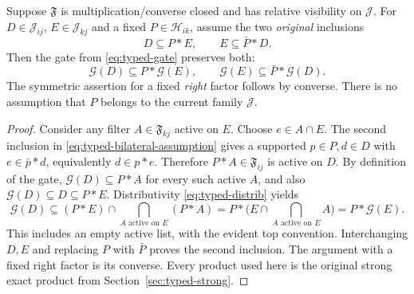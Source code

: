 \begin{lemma}
\label{lem:typed-bilateral}
Suppose $\mathfrak F$ is multiplication/converse closed and has
relative visibility on $\mathcal J$.  For
$D\in\mathcal J_{ij}$, $E\in\mathcal J_{kj}$ and a fixed
$P\in\mathcal H_{ik}$, assume the two \emph{original} inclusions
\begin{equation}\label{eq:typed-bilateral-assumption}
 D\subseteq P*E,\qquad E\subseteq\bar P*D.
\end{equation}
Then the gate from \eqref{eq:typed-gate} preserves both:
\begin{equation}\label{eq:typed-bilateral-conclusion}
 \mathcal G(D)\subseteq P*\mathcal G(E),\qquad
 \mathcal G(E)\subseteq\bar P*\mathcal G(D).
\end{equation}
The symmetric assertion for a fixed \emph{right} factor follows by
converse.  There is no assumption that $P$ belongs to the current
family $\mathcal J$.
\end{lemma}
\begin{proof}
Consider any filter $A\in\mathfrak F_{kj}$ active on $E$.
Choose $e\in A\cap E$.  The second inclusion in
\eqref{eq:typed-bilateral-assumption} gives a supported
$p\in P,d\in D$ with $e\in\bar p*d$, equivalently
$d\in p*e$.  Therefore $P*A\in\mathfrak F_{ij}$ is active
on $D$.  By definition of the gate,
$\mathcal G(D)\subseteq P*A$ for every such active $A$, and also
$\mathcal G(D)\subseteq D\subseteq P*E$.  Distributivity
\eqref{eq:typed-distrib} yields
\[
 \mathcal G(D)\subseteq
 (P*E)\cap\bigcap_{A\text{ active on }E}(P*A)
 =P*\biggl(E\cap\bigcap_{A\text{ active on }E}A\biggr)
 =P*\mathcal G(E).
\]
This includes an empty active list, with the evident top convention.
Interchanging $D,E$ and replacing $P$ with $\bar P$ proves the
second inclusion.  The argument with a fixed right factor is its
converse.  Every product used here is the original strong exact
product from Section~\ref{sec:typed-strong}.
\end{proof}

